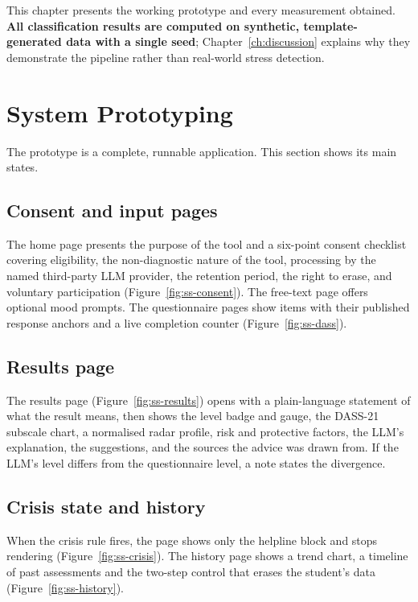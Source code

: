This chapter presents the working prototype and every measurement obtained. \textbf{All classification results are computed on synthetic, template-generated data with a single seed}; Chapter~\ref{ch:discussion} explains why they demonstrate the pipeline rather than real-world stress detection.

\section{System Prototyping}
The prototype is a complete, runnable application. This section shows its main states.

\subsection{Consent and input pages}
The home page presents the purpose of the tool and a six-point consent checklist covering eligibility, the non-diagnostic nature of the tool, processing by the named third-party LLM provider, the retention period, the right to erase, and voluntary participation (Figure~\ref{fig:ss-consent}). The free-text page offers optional mood prompts. The questionnaire pages show items with their published response anchors and a live completion counter (Figure~\ref{fig:ss-dass}).


\subsection{Results page}
The results page (Figure~\ref{fig:ss-results}) opens with a plain-language statement of what the result means, then shows the level badge and gauge, the DASS-21 subscale chart, a normalised radar profile, risk and protective factors, the LLM's explanation, the suggestions, and the sources the advice was drawn from. If the LLM's level differs from the questionnaire level, a note states the divergence.


\subsection{Crisis state and history}
When the crisis rule fires, the page shows only the helpline block and stops rendering (Figure~\ref{fig:ss-crisis}). The history page shows a trend chart, a timeline of past assessments and the two-step control that erases the student's data (Figure~\ref{fig:ss-history}).

